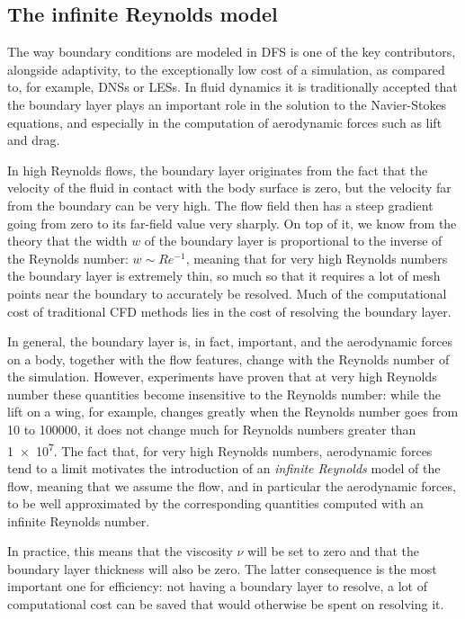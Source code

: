 \subsection{The infinite Reynolds model}
\label{sub_infiniteRe}
The way boundary conditions are modeled in DFS is one of the key contributors, alongside adaptivity, to the exceptionally low cost of a simulation, as compared to, for example, DNSs or LESs.
In fluid dynamics it is traditionally accepted that the boundary layer plays an important role in the solution to the Navier-Stokes equations, and especially in the computation of aerodynamic forces such as lift and drag.

In high Reynolds flows, the boundary layer originates from the fact that the velocity of the fluid in contact with the body surface is zero, but the velocity far from the boundary can be very high.
The flow field then has a steep gradient going from zero to its far-field value very sharply.
On top of it, we know from the theory that the width \(w\) of the boundary layer is proportional to the inverse of the Reynolds number: \(w \sim Re^{-1}\), meaning that for very high Reynolds numbers the boundary layer is extremely thin, so much so that it requires a lot of mesh points near the boundary to accurately be resolved.
Much of the computational cost of traditional CFD methods lies in the cost of resolving the boundary layer.

In general, the boundary layer is, in fact, important, and the aerodynamic forces on a body, together with the flow features, change with the Reynolds number of the simulation.
However, experiments have proven that at very high Reynolds number these quantities become insensitive to the Reynolds number: while the lift on a wing, for example, changes greatly when the Reynolds number goes from \num{10} to \num{100000}, it does not change much for Reynolds numbers greater than \num{1e7}.
The fact that, for very high Reynolds numbers, aerodynamic forces tend to a limit motivates the introduction of an \emph{infinite Reynolds} model of the flow, meaning that we assume the flow, and in particular the aerodynamic forces, to be well approximated by the corresponding quantities computed with an infinite Reynolds number.

In practice, this means that the viscosity \(\nu\) will be set to zero and that the boundary layer thickness will also be zero.
The latter consequence is the most important one for efficiency: not having a boundary layer to resolve, a lot of computational cost can be saved that would otherwise be spent on resolving it.

